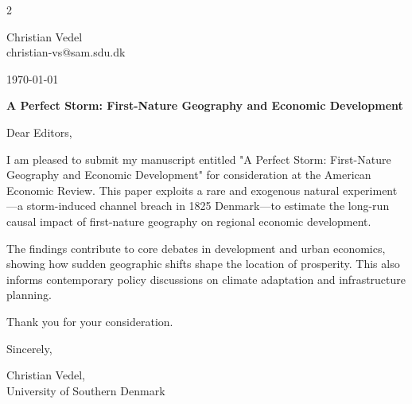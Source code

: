 \documentclass[11pt]{article}
\begin{document}
\begin{multicols}{2}
\begin{flushleft}
    \small
    Christian Vedel \\
    christian-vs@sam.sdu.dk \\
\end{flushleft}
\columnbreak
\begin{flushright}
    \small
    \today
\end{flushright}
\end{multicols}

\vspace{0.25cm}
    \Large
    \textbf{A Perfect Storm: First-Nature Geography and Economic Development}


\vspace{1cm}

Dear Editors, 

I am pleased to submit my manuscript entitled "A Perfect Storm: First-Nature Geography and Economic Development" for consideration at the American Economic Review. This paper exploits a rare and exogenous natural experiment—a storm-induced channel breach in 1825 Denmark—to estimate the long-run causal impact of first-nature geography on regional economic development.

The findings contribute to core debates in development and urban economics, showing how sudden geographic shifts shape the location of prosperity. This also informs contemporary policy discussions on climate adaptation and infrastructure planning.

Thank you for your consideration.

\vspace{0.5cm}

Sincerely,

Christian Vedel,\\
University of Southern Denmark
\end{document}
